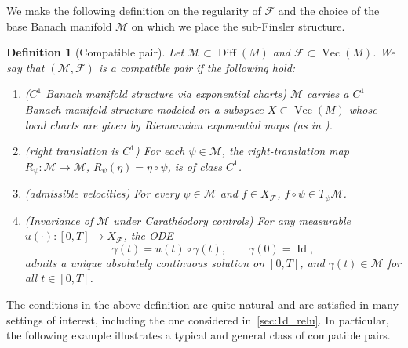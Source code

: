 \documentclass[12pt]{amsart}
\numberwithin{equation}{section}
\newtheorem{definition}{Definition}[section]
\theoremstyle{remark}
\begin{document}
We make the following definition on the regularity of $\mathcal F$ and the choice of the base Banach manifold $\mathcal M$ on which we place the sub-Finsler structure.

\begin{definition}[Compatible pair]\label{def:compatible-pair}
Let $\mathcal M\subset \operatorname{Diff}(M)$ and $\mathcal F\subset \operatorname{Vec}(M)$.
We say that $(\mathcal M,\mathcal F)$ is a \emph{compatible pair} if the following hold:
\begin{enumerate}
\item \textup{($C^1$ Banach manifold structure via exponential charts)}
$\mathcal M$ carries a $C^1$ Banach manifold structure modeled on a subspace $X\subset \operatorname{Vec}(M)$ whose local charts are given by
Riemannian exponential maps (as in ).

\item \textup{(right translation is $C^1$)}
For each $\psi\in\mathcal M$, the right-translation map
$R_\psi:\mathcal M\to \mathcal M$, $R_\psi(\eta)=\eta\circ\psi$,
is of class $C^1$.

\item \textup{(admissible velocities)}
For every $\psi\in\mathcal M$ and $f\in X_{\mathcal F}$, $f\circ\psi\in T_\psi\mathcal M$.

\item \textup{(Invariance of $\mathcal M$ under Carath\'eodory controls)} For any measurable $u(\cdot):[0,T]\to X_{\mathcal F}$, the ODE
\begin{equation}
\dot\gamma(t)=u(t)\circ\gamma(t),\qquad \gamma(0)=\operatorname{Id},
\end{equation}
admits a unique absolutely continuous solution on $[0,T]$, and $\gamma(t)\in\mathcal M$ for all $t\in[0,T]$.
\end{enumerate}
\end{definition}
The conditions in the above definition are quite natural and are satisfied in many settings of interest, including the one considered in~\cref{sec:1d_relu}. In particular, the following example illustrates a typical and general class of compatible pairs.
\end{document}
